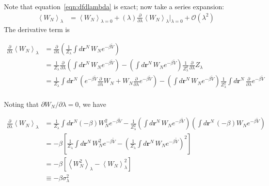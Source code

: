 \documentclass[letterpaper,twocolumn,amsmath,amssymb,prb]{revtex4-1}
\newcommand{\rr}{\ensuremath{\mathbf{r}}}
\newcommand{\1}{\ensuremath{\textbf{r}_1}}
\newcommand{\2}{\ensuremath{\textbf{r}_2}}
\newcommand{\3}{\ensuremath{\textbf{r}_3}}
\newcommand{\4}{\ensuremath{\textbf{r}_4}}
\begin{document}
Note that equation~\ref{eqn:dfdlambda} is exact; now take a series expansion:
\begin{align}
  \left\langle W_N \right\rangle_\lambda &= \left\langle W_N\right\rangle_{\lambda = 0} + (\lambda)\frac{\partial}{\partial\lambda}\left\langle W_N \right\rangle_{\lambda}\bigg|_{\lambda = 0} + \mathcal{O}(\lambda^2) \label{eqn:Wn-expansion}
\end{align}
The derivative term is
\begin{widetext}
  \begin{align}
    \frac{\partial}{\partial\lambda}\left\langle W_N \right\rangle_{\lambda} &= \frac{\partial}{\partial\lambda}\left( \frac{1}{Z_\lambda}\int d\rr^N\, W_N e^{-\beta \widetilde{V}}\right) \\
    &= \frac{1}{Z_\lambda}\frac{\partial}{\partial\lambda}\left( \int d\rr^N\, W_N e^{-\beta \widetilde{V}} \right) - \left( \int d\rr^N\, W_N e^{-\beta \widetilde{V}} \right)\frac{1}{Z_\lambda^2}\frac{\partial}{\partial\lambda}Z_\lambda \\
    &= \frac{1}{Z_\lambda}\int d\rr^N\, \left( e^{-\beta \widetilde{V}}\frac{\partial}{\partial\lambda}W_N + W_N\frac{\partial}{\partial\lambda}e^{-\beta \widetilde{V}} \right) - \left( \int d\rr^N\, W_N e^{-\beta \widetilde{V}} \right)\frac{1}{Z_\lambda^2}\int d\rr^N\, \frac{\partial}{\partial\lambda}e^{-\beta \widetilde{V}} \\
  \end{align}
\end{widetext}

Noting that $\partial W_N/\partial\lambda = 0$, we have
\begin{widetext}
  \begin{align}
    \frac{\partial}{\partial\lambda}\left\langle W_N \right\rangle_{\lambda} &= \frac{1}{Z_\lambda}\int d\rr^N (-\beta) W_N^2 e^{-\beta \widetilde{V}} - \frac{1}{Z_\lambda^2}\left(\int d\rr^N\, W_N e^{-\beta \widetilde{V}} \right)\left( \int d\rr^N\, (-\beta)W_Ne^{-\beta \widetilde{V}} \right) \\
    &= -\beta\left[ \frac{1}{Z_\lambda}\int d\rr^N\, W_N^2e^{-\beta \widetilde{V}} - \left( \frac{1}{Z_\lambda}\int d\rr^N\, W_N e^{-\beta \widetilde{V}} \right)^2 \right] \\
    &= -\beta\left[ \left\langle W_N^2 \right\rangle_\lambda - \left\langle W_N \right\rangle_\lambda^2 \right] \\
    &\equiv -\beta\sigma_\lambda^2
  \end{align}
\end{widetext}
\end{document}
